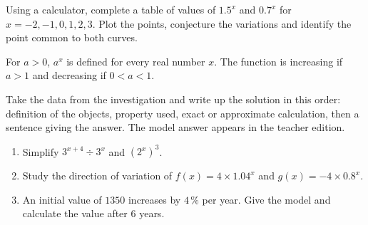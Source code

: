 \begin{activite}
Using a calculator, complete a table of values of $1.5^x$ and $0.7^x$ for $x=-2,-1,0,1,2,3$. Plot the points, conjecture the variations and identify the point common to both curves.
\begin{center}\end{center}
\end{activite}

\begin{traceecrite}For $a>0$, $a^x$ is defined for every real number $x$. The function is increasing if $a>1$ and decreasing if $0<a<1$.\end{traceecrite}

\begin{exemple}
Take the data from the investigation and write up the solution in this order: definition of the objects, property used, exact or approximate calculation, then a sentence giving the answer. The model answer appears in the teacher edition.
\end{exemple}

\begin{exercice}[-- essential]
\begin{enumerate}\item Simplify $3^{x+4}\div3^x$ and $(2^x)^3$.\item Study the direction of variation of $f(x)=4\times1.04^x$ and $g(x)=-4\times0.8^x$.\item An initial value of $1350$ increases by $4\,\%$ per year. Give the model and calculate the value after $6$ years.\end{enumerate}
\end{exercice}

